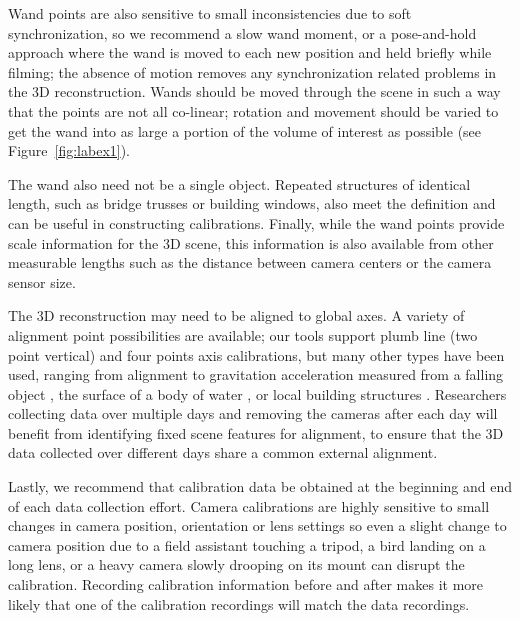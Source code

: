 \documentclass[fleqn,10pt]{wlpeerj}
\begin{document}
Wand points are also sensitive to small inconsistencies due to soft synchronization, so we recommend a slow wand moment, or a pose-and-hold approach where the wand is moved to each new position and held briefly while filming; the absence of motion removes any synchronization related problems in the 3D reconstruction. Wands should be moved through the scene in such a way that the points are not all co-linear; rotation and movement should be varied to get the wand into as large a portion of the volume of interest as possible (see Figure~\ref{fig:labex1}). 

 The wand also need not be a single object.  Repeated structures of identical length, such as bridge trusses or building windows, also meet the definition and can be useful in constructing calibrations. Finally, while the wand points provide scale information for the 3D scene, this information is also available from other measurable lengths such as the distance between camera centers or the camera sensor size. 

The 3D reconstruction may need to be aligned to global axes.  A variety of alignment point possibilities are available; our tools support plumb line (two point vertical) and four points axis calibrations, but many other types have been used, ranging from alignment to gravitation acceleration measured from a falling object \citep{Shelton14}, the surface of a body of water \citep{clifton2015}, or local building structures \citep{sholtis2015}. Researchers collecting data over multiple days and removing the cameras after each day will benefit from identifying fixed scene features for alignment, to ensure that the 3D data collected over different days share a common external alignment. 

Lastly, we recommend that calibration data be obtained at the beginning and end of each data collection effort. Camera calibrations are highly sensitive to small changes in camera position, orientation or lens settings so even a slight change to camera position due to a field assistant touching a tripod, a bird landing on a long lens, or a heavy camera slowly drooping on its mount can disrupt the calibration. Recording calibration information before and after makes it more likely that one of the calibration recordings will match the data recordings.
\end{document}
